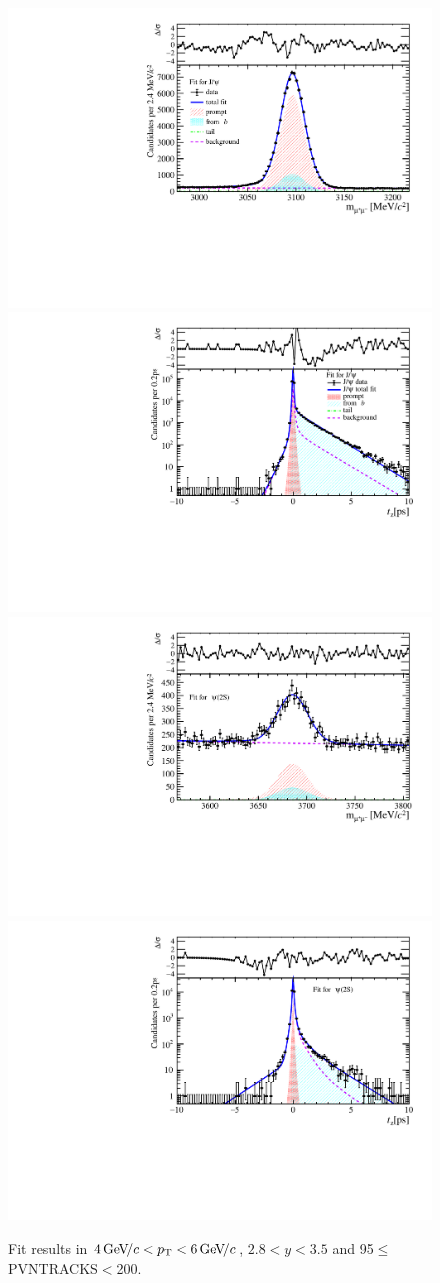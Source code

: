 \begin{figure}[H]
\begin{center}
\includegraphics[width=0.47\linewidth]{pdf/Jpsi/drawmass/n5y2pt3.pdf}
\includegraphics[width=0.47\linewidth]{pdf/Jpsi/2DFit/n5y2pt3.pdf}
\vspace*{-0.5cm}
\includegraphics[width=0.47\linewidth]{pdf/Psi2S/drawmass/n5y2pt3.pdf}
\includegraphics[width=0.47\linewidth]{pdf/Psi2S/2DFit/n5y2pt3.pdf}
\vspace*{-0.5cm}
\end{center}
\caption{Fit results in $4\text{\,Ge\kern -0.1em V\!/}c<p_{\mathrm{T}}<6\text{\,Ge\kern -0.1em V\!/}c$, $2.8<y<3.5$ and 95$\leq$PVNTRACKS$<$200.}
\label{Fitn5y2pt3}
\end{figure}

